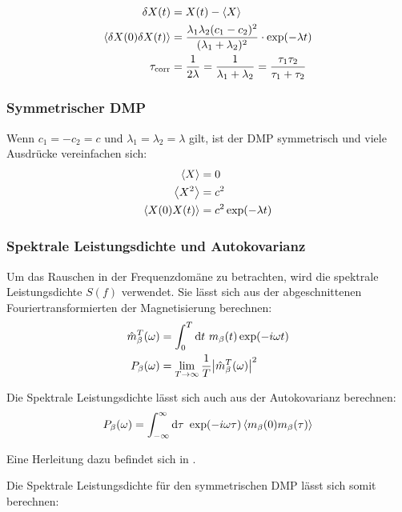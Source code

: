 \documentclass[main.tex]{subfiles}
\begin{document}
\begin{align}
	\delta X(t) & = X(t) - \expval{X}\\
	\expval{\delta X(0)\delta X(t)} &= \frac{\lambda_1 \lambda_2
	(c_1-c_2)^2}{(\lambda_1 + \lambda_2)^2} \cdot \exp(-\lambda t)\\
	\tau_\mathrm{corr} &= \frac{1}{2\lambda} = \frac{1}{\lambda_1 +
		\lambda_2} = \frac{\tau_1 \tau_2}{\tau_1 + \tau_2}
\end{align}

\subsubsection*{Symmetrischer DMP}

Wenn \(c_1=-c_2=c\) und \(\lambda_1 = \lambda_2 = \lambda\) gilt, ist der DMP
symmetrisch und viele Ausdrücke vereinfachen sich:
\begin{align}
	\expval{X}        & = 0                    \\
	\expval{X^2}      & = c^2                  \\
	\expval{X(0)X(t)} & = c^2 \exp(-\lambda t)
\end{align}\cite{matphys}
\subsubsection*{Spektrale Leistungsdichte und Autokovarianz}

Um das Rauschen in der Frequenzdomäne zu betrachten, wird die spektrale
Leistungsdichte \(S(f)\) verwendet. Sie lässt sich aus der abgeschnittenen
Fouriertransformierten der Magnetisierung berechnen:
\begin{align}
	\hat{m}_\beta^T(\omega) & = \int_0^T \mathrm{d} t \ m_\beta(t) \exp(-i \omega
	t)
	\\
	P_{\beta}(\omega)       & = \lim_{T \to \infty} \frac{1}{T}
	\abs{\hat{m}_\beta^T(\omega)}^2
\end{align}

Die Spektrale Leistungsdichte lässt sich auch aus der Autokovarianz berechnen:
\begin{align}
	P_\beta(\omega) = \int_{-\infty}^{\infty} \mathrm{d} \tau \ \exp(-i \omega
	\tau) \expval{m_\beta(0) m_\beta(\tau)}
\end{align}

Eine Herleitung dazu befindet sich in \cite{schlegel-master}.

Die Spektrale Leistungsdichte für den symmetrischen DMP lässt sich somit berechnen:
\end{document}
